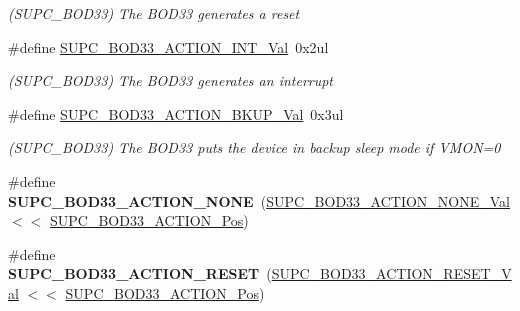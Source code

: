 \begin{DoxyCompactItemize}
\begin{DoxyCompactList}\small\item\em (S\+U\+P\+C\+\_\+\+B\+O\+D33) The B\+O\+D33 generates a reset \end{DoxyCompactList}\item 
\hypertarget{group___s_a_m_l21___s_u_p_c_ga233a44ba6e1e663e692832cf2bb74afe}{}\#define \hyperlink{group___s_a_m_l21___s_u_p_c_ga233a44ba6e1e663e692832cf2bb74afe}{S\+U\+P\+C\+\_\+\+B\+O\+D33\+\_\+\+A\+C\+T\+I\+O\+N\+\_\+\+I\+N\+T\+\_\+\+Val}~0x2ul\label{group___s_a_m_l21___s_u_p_c_ga233a44ba6e1e663e692832cf2bb74afe}

\begin{DoxyCompactList}\small\item\em (S\+U\+P\+C\+\_\+\+B\+O\+D33) The B\+O\+D33 generates an interrupt \end{DoxyCompactList}\item 
\hypertarget{group___s_a_m_l21___s_u_p_c_ga154a98779bef7cb80f43330e6d981d1a}{}\#define \hyperlink{group___s_a_m_l21___s_u_p_c_ga154a98779bef7cb80f43330e6d981d1a}{S\+U\+P\+C\+\_\+\+B\+O\+D33\+\_\+\+A\+C\+T\+I\+O\+N\+\_\+\+B\+K\+U\+P\+\_\+\+Val}~0x3ul\label{group___s_a_m_l21___s_u_p_c_ga154a98779bef7cb80f43330e6d981d1a}

\begin{DoxyCompactList}\small\item\em (S\+U\+P\+C\+\_\+\+B\+O\+D33) The B\+O\+D33 puts the device in backup sleep mode if V\+M\+O\+N=0 \end{DoxyCompactList}\item 
\hypertarget{group___s_a_m_l21___s_u_p_c_ga0e22ab7c5552aaadf0059be505ed5f35}{}\#define {\bfseries S\+U\+P\+C\+\_\+\+B\+O\+D33\+\_\+\+A\+C\+T\+I\+O\+N\+\_\+\+N\+O\+N\+E}~(\hyperlink{group___s_a_m_l21___s_u_p_c_gafc3d193080f968fdcb16a5f927097593}{S\+U\+P\+C\+\_\+\+B\+O\+D33\+\_\+\+A\+C\+T\+I\+O\+N\+\_\+\+N\+O\+N\+E\+\_\+\+Val}    $<$$<$ \hyperlink{group___s_a_m_l21___s_u_p_c_ga8e1dbd232c21c8618d6ee2ea49c093ad}{S\+U\+P\+C\+\_\+\+B\+O\+D33\+\_\+\+A\+C\+T\+I\+O\+N\+\_\+\+Pos})\label{group___s_a_m_l21___s_u_p_c_ga0e22ab7c5552aaadf0059be505ed5f35}

\item 
\hypertarget{group___s_a_m_l21___s_u_p_c_ga1b2dc8e7ed96216dc1d17d776b67f377}{}\#define {\bfseries S\+U\+P\+C\+\_\+\+B\+O\+D33\+\_\+\+A\+C\+T\+I\+O\+N\+\_\+\+R\+E\+S\+E\+T}~(\hyperlink{group___s_a_m_l21___s_u_p_c_gab8c0721cf662d300e2a5acb1d517a1d4}{S\+U\+P\+C\+\_\+\+B\+O\+D33\+\_\+\+A\+C\+T\+I\+O\+N\+\_\+\+R\+E\+S\+E\+T\+\_\+\+Val}   $<$$<$ \hyperlink{group___s_a_m_l21___s_u_p_c_ga8e1dbd232c21c8618d6ee2ea49c093ad}{S\+U\+P\+C\+\_\+\+B\+O\+D33\+\_\+\+A\+C\+T\+I\+O\+N\+\_\+\+Pos})\label{group___s_a_m_l21___s_u_p_c_ga1b2dc8e7ed96216dc1d17d776b67f377}


\end{DoxyCompactItemize}
